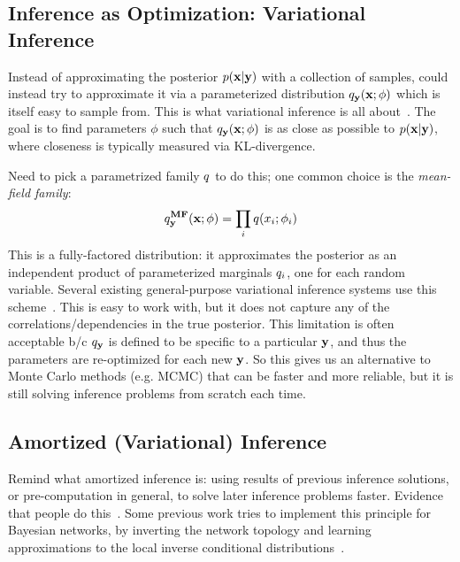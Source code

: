 \subsection{Inference as Optimization: Variational Inference}
\label{sec:background:variational}

Instead of approximating the posterior $p(\mathbf{x} | \mathbf{y})$ with a collection of samples, could instead try to approximate it via a parameterized distribution $q_{\mathbf{y}}(\mathbf{x} ; \phi)$ which is itself easy to sample from.
This is what variational inference is all about~\cite{VariationalInference}.
The goal is to find parameters $\phi$ such that $q_{\mathbf{y}}(\mathbf{x} ; \phi)$ is as close as possible to $p(\mathbf{x} | \mathbf{y})$, where closeness is typically measured via KL-divergence.

Need to pick a parametrized family $q$ to do this; one common choice is the \emph{mean-field family}:
\begin{equation*}
q^{\textbf{MF}}_{\mathbf{y}}(\mathbf{x} ; \phi) = \prod_i q(x_i ; \phi_i)
\end{equation*}
This is a fully-factored distribution: it approximates the posterior as an independent product of parameterized marginals $q_i$, one for each random variable.
Several existing general-purpose variational inference systems use this scheme~\cite{AVIPP,BBVI}.
This is easy to work with, but it does not capture any of the correlations/dependencies in the true posterior.
This limitation is often acceptable b/c $q_{\mathbf{y}}$ is defined to be specific to a particular $\mathbf{y}$, and thus the parameters are re-optimized for each new $\mathbf{y}$.
So this gives us an alternative to Monte Carlo methods (e.g. MCMC) that can be faster and more reliable, but it is still solving inference problems from scratch each time.

\subsection{Amortized (Variational) Inference}

Remind what amortized inference is: using results of previous inference solutions, or pre-computation in general, to solve later inference problems faster.
Evidence that people do this~\cite{AmortizedInference}.
Some previous work tries to implement this principle for Bayesian networks, by inverting the network topology and learning approximations to the local inverse conditional distributions~\cite{StochasticInverses,NeuralStochasticInverses}.

